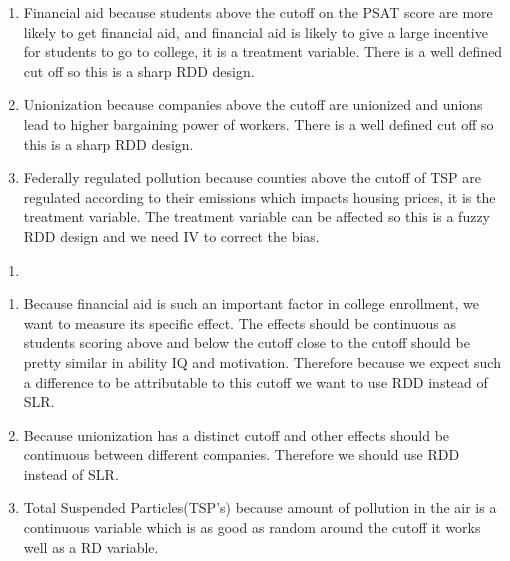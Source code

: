 \documentclass[
  12pt,
  landscape]{article}
\begin{document}
\begin{enumerate}
\def\labelenumi{\roman{enumi})}
\item
  Financial aid because students above the cutoff on the PSAT score are
  more likely to get financial aid, and financial aid is likely to give
  a large incentive for students to go to college, it is a treatment
  variable. There is a well defined cut off so this is a sharp RDD
  design.
\item
  Unionization because companies above the cutoff are unionized and
  unions lead to higher bargaining power of workers. There is a well
  defined cut off so this is a sharp RDD design.
\item
  Federally regulated pollution because counties above the cutoff of TSP
  are regulated according to their emissions which impacts housing
  prices, it is the treatment variable. The treatment variable can be
  affected so this is a fuzzy RDD design and we need IV to correct the
  bias.
\end{enumerate}

\begin{enumerate}
\def\labelenumi{(\alph{enumi})}
\setcounter{enumi}{3}
\item
\end{enumerate}

\begin{enumerate}
\def\labelenumi{\roman{enumi})}
\item
  Because financial aid is such an important factor in college
  enrollment, we want to measure its specific effect. The effects should
  be continuous as students scoring above and below the cutoff close to
  the cutoff should be pretty similar in ability IQ and motivation.
  Therefore because we expect such a difference to be attributable to
  this cutoff we want to use RDD instead of SLR.
\item
  Because unionization has a distinct cutoff and other effects should be
  continuous between different companies. Therefore we should use RDD
  instead of SLR.
\item
  Total Suspended Particles(TSP's) because amount of pollution in the
  air is a continuous variable which is as good as random around the
  cutoff it works well as a RD variable.
\end{enumerate}
\end{document}
